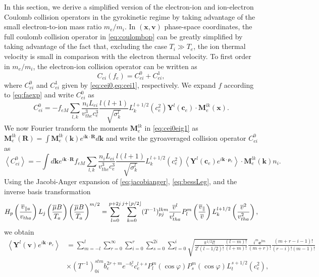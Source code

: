 In this section, we derive a simplified version of the electron-ion and ion-electron Coulomb collision operators in the gyrokinetic regime by taking advantage of the small electron-to-ion mass ratio $m_e/m_i$.
%
In $(\mathbf x, \mathbf v)$ phase-space coordinates, the full coulomb collision operator in \cref{eq:coulombop} can be greatly simplified by taking advantage of the fact that, excluding the case $T_i \gg T_e$, the ion thermal velocity is small in comparison with the electron thermal velocity.
%
To first order in $m_e/m_i$, the electron-ion collision operator can be written as \citep{Helander2002}
%
\begin{equation}
    C_{ei}(f_e)=C_{ei}^0+C_{ei}^1,
\end{equation}
%
where $C_{ei}^0$ and $C_{ei}^1$ given by \cref{eq:cei0,eq:cei1}, respectively.
%
We expand $f$ according to \cref{eq:faexp} and write $C_{ei}^0$ as
%
\begin{equation}
    C_{ei}^0=-f_{eM}\sum_{l,k}\frac{n_i L_{ei}}{v_{the}^3 c_e^3}\frac{l(l+1)}{\sqrt{\sigma_k^l}}L_k^{l+1/2}\left(c_e^2\right) \mathbf Y^l(\mathbf c_e) \cdot {\mathbf M}_e^{lk}(\mathbf x).
    \label{eq:cei0eig1}
\end{equation}
%
We now Fourier transform the moments $\mathbf M_e^{lk}$ in \cref{eq:cei0eig1} as $\mathbf M_e^{lk}(\mathbf R) = \int \mathbf M_e^{lk}(\mathbf k)e^{i \mathbf k \cdot \mathbf R} d \mathbf k$ and write the gyroaveraged collision operator $C_{ei}^0$ as
%
\begin{equation}
    \left<C_{ei}^0\right>=-\int d\mathbf k e^{i \mathbf k \cdot \mathbf R} f_{eM}\sum_{l,k}\frac{n_i L_{ei}}{v_{the}^3 c_e^3}\frac{l(l+1)}{\sqrt{\sigma_k^l}} L_k^{l+1/2}\left(c_e^2\right) \left<\mathbf Y^l(\mathbf c_e) e^{i \mathbf k \cdot \mathbf \rho_e}\right>\cdot \mathbf M_{e}^{lk}(\mathbf k) n_i .
    \label{eq:cei0eiggyro}
\end{equation}
%
Using the Jacobi-Anger expansion of \cref{eq:jacobianger}, \cref{eq:bessLeg}, and the inverse basis transformation 
%
\begin{equation}
   H_p\left(\frac{\overline v_{\parallel a}}{v_{tha}}\right)L_j\left(\frac{\overline \mu B}{T_a}\right)\left(\frac{\overline \mu B}{T_a}\right)^{m/2} = \sum_{l=0}^{p+2j}\sum_{k=0}^{j+\lfloor p/2\rfloor}(T^{-1})_{pj}^{lkm}  \frac{\overline v^l}{v_{tha}^l} P_l^m\left(\frac{\overline v_\parallel}{\overline v}\right) L_k^{l+1/2}\left(\frac{\overline v^2}{v_{tha}^2}\right),
\label{eq:inversebasistransf}
\end{equation}
%
we obtain
%
\begin{align}
    \left<\mathbf Y^l(\mathbf v) e^{i \mathbf k \cdot \mathbf \rho_e}\right> &= \sum_{m=-l}^l \sum_{r=0}^\infty \sum_{i=0}^{r}\sum_{s=0}^{2i}\sum_{t=0}^i \sqrt{\frac{\pi^{1/2}l!}{2^l(l-1/2)!}\frac{(l-m)!}{(l+m)!}}\frac{i^m \mathbf e^{lm}}{(m+r)!}\frac{(m+r-i-1)!}{(r-i)!(m-1)!}\nonumber\\
    &\times (T^{-1})_{0i}^{stm}b_e^{2r+m}e^{-b_e^2}c_e^{l+s}P_l^m(\cos \varphi)P_s^m(\cos \varphi) L_t^{s+1/2}(c_e^2),
\label{eq:Ylexpgyro}
\end{align}

